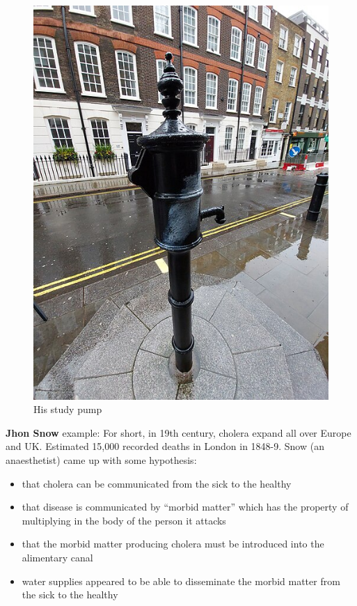 \documentclass[
  letterpaper,
  DIV=11,
  numbers=noendperiod]{scrreprt}
\begin{document}
\begin{figure}
\begin{minipage}[b]{0.50\linewidth}
{{\includegraphics{./images/john_snow_pump.jpg}

}

\caption{His study pump}

}

\end{minipage}%

\end{figure}

\textbf{Jhon Snow} example: For short, in 19th century, cholera expand
all over Europe and UK. Estimated 15,000 recorded deaths in London in
1848-9. Snow (an anaesthetist) came up with some hypothesis:

\begin{itemize}
\item
  that cholera can be communicated from the sick to the healthy
\item
  that disease is communicated by ``morbid matter'' which has the
  property of multiplying in the body of the person it attacks
\item
  that the morbid matter producing cholera must be introduced into the
  alimentary canal
\item
  water supplies appeared to be able to disseminate the morbid matter
  from the sick to the healthy
\end{itemize}
\end{document}
